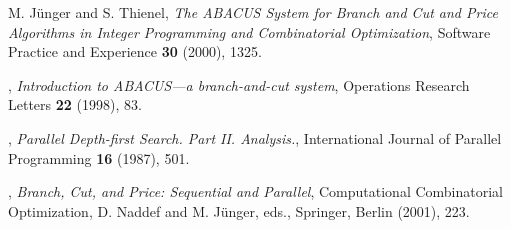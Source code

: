 \begin{thebibliography}{9}
 {\sc M. J\"unger and S. Thienel}, {\em The ABACUS System
for Branch and Cut and Price Algorithms in Integer Programming and
Combinatorial Optimization}, Software Practice and Experience {\bf 30}
(2000), 1325.

, {\em Introduction to
ABACUS---a branch-and-cut system}, Operations Research Letters {\bf
22} (1998), 83.





, {\em Parallel Depth-first
Search. Part II. Analysis.}, International Journal of Parallel
Programming {\bf 16} (1987), 501.





,
{\em Branch, Cut, and Price: Sequential and Parallel},
Computational Combinatorial Optimization, D. Naddef and M.
J\"unger, eds., Springer, Berlin (2001), 223.


\end{thebibliography}
